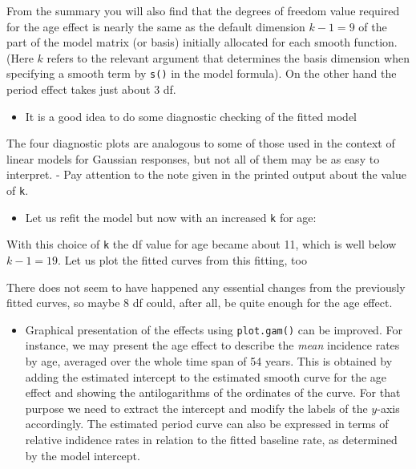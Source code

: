 \documentclass[
]{book}
\providecommand{\tightlist}{%
  \setlength{\itemsep}{0pt}\setlength{\parskip}{0pt}}
\begin{document}
From the summary you will also find that the degrees of freedom value
required for the age effect is nearly the same as the default
dimension \(k-1 = 9\) of the part of the model matrix (or basis)
initially allocated for each smooth function. (Here \(k\) refers to the
relevant argument that determines the basis dimension when specifying
a smooth term by \texttt{s()} in the model formula). On the other
hand the period effect takes just about 3 df.

\begin{itemize}
\tightlist
\item
  It is a good idea to do some diagnostic checking of the fitted
  model
\end{itemize}

The four diagnostic plots are analogous to some of those used in
the context of linear models for Gaussian responses, but not all of them
may be as easy to interpret. - Pay attention to the note
given in the printed output about the value of \texttt{k}.

\begin{itemize}
\tightlist
\item
  Let us refit the model but now with an increased \texttt{k} for age:
\end{itemize}

With this choice of \texttt{k} the df value for age became about 11,
which is well below \(k-1 = 19\). Let us plot the fitted curves from
this fitting, too

There does not seem to have happened any essential changes from the
previously fitted curves, so maybe 8 df could, after all, be quite
enough for the age effect.

\begin{itemize}
\tightlist
\item
  Graphical presentation of the effects using \texttt{plot.gam()}
  can be improved. For instance, we may present the
  age effect to describe the \emph{mean} incidence rates by age, averaged
  over the whole time span of 54 years. This is obtained by adding
  the estimated intercept
  to the estimated smooth curve for the age effect and showing
  the antilogarithms of the ordinates of the curve.
  For that purpose we need to extract the intercept and modify the
  labels of the \(y\)-axis accordingly. The estimated period curve
  can also be expressed in terms of
  relative indidence rates in relation to the fitted baseline rate,
  as determined by the model intercept.
\end{itemize}
\end{document}
